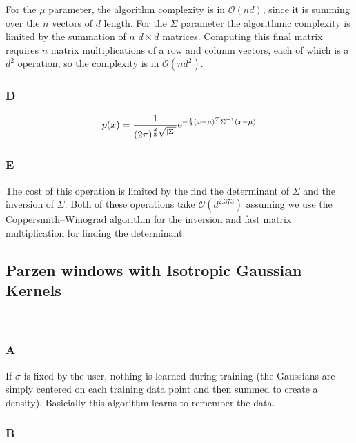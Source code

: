 \documentclass{amsart}
\theoremstyle{definition}
\theoremstyle{remark}
\numberwithin{equation}{section}
\begin{document}
For the $\mathcal{\mu}$ parameter, the algorithm complexity is in 
$\mathcal{O}(nd)$, since it is summing over the $n$ vectors of 
$d$ length. For the $\Sigma$ parameter the algorithmic complexity 
is limited by the summation of $n$ $d \times d$ matrices. Computing 
this final matrix requires $n$ matrix multiplications of a row and 
column vectors, each of which is a $d^2$ operation, so the complexity
is in $\mathcal{O}(nd^2)$. 


\subsubsection{D} 

\begin{equation}
    p(x) = \frac{1}{(2\pi)^{\frac{d}{2} \sqrt{|\Sigma|}}} {\rm e}^{-\frac{1}{2}(x-\mu)^T \Sigma^{-1} (x-\mu)}   
\end{equation}
 
\subsubsection{E} 

The cost of this operation is limited by the find the determinant of $\Sigma$
and the inversion of $\Sigma$. Both of these operations take $\mathcal{O}(d^{2.373})$  
assuming we use the Coppersmith–Winograd algorithm for the inversion and fast
matrix multiplication for finding the determinant. \\

\subsection{Parzen windows with Isotropic Gaussian Kernels} \\

\subsubsection{A} 

 If $\sigma$ is fixed by the user, nothing is learned during training (the 
Gaussians are simply centered on each training data point and then summed to 
create a density). Basicially this algorithm learns to remember the data. \\

\subsubsection{B} 
\end{document}

